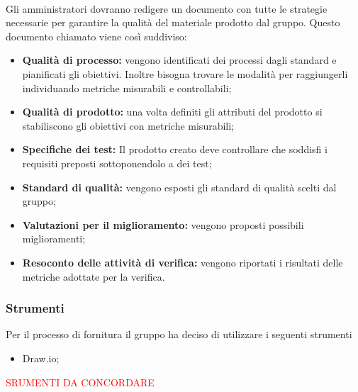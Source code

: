 \paragraph{\PdQ} Gli amministratori dovranno redigere un documento con tutte le strategie necessarie per garantire la qualità del materiale prodotto dal gruppo. Questo documento chiamato \PdQv{} viene così suddiviso:
\begin{itemize}
    \item \textbf{Qualità di processo:} vengono identificati dei processi dagli standard e pianificati gli obiettivi. Inoltre bisogna trovare le modalità per raggiungerli individuando metriche misurabili e controllabili;
    
    \item \textbf{Qualità di prodotto:} una volta definiti gli attributi del prodotto si stabiliscono gli obiettivi con metriche misurabili;
    
    \item \textbf{Specifiche dei test:} Il prodotto creato deve controllare che soddisfi i requisiti preposti sottoponendolo a dei test;
    
    \item \textbf{Standard di qualità:} vengono esposti gli standard di qualità scelti dal gruppo;
    
    \item \textbf{Valutazioni per il miglioramento:} vengono proposti possibili miglioramenti;
    
    \item \textbf{Resoconto delle attività di verifica:} vengono riportati i risultati delle metriche adottate per la verifica.
\end{itemize}

\subsubsection{Strumenti}
Per il processo di fornitura il gruppo ha deciso di utilizzare i seguenti strumenti
\begin{itemize}
    \item{Draw.io;}
\end{itemize}

\textcolor{red}{SRUMENTI DA CONCORDARE}
